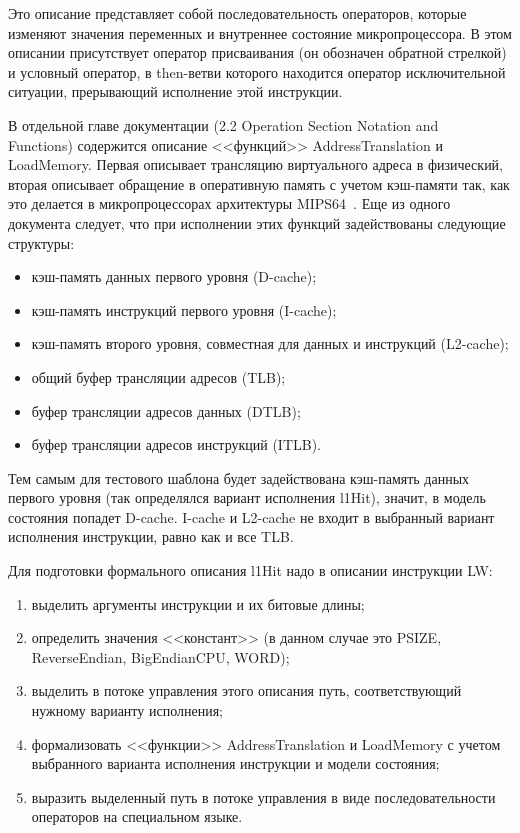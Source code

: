 Это описание представляет собой последовательность операторов, которые изменяют значения переменных и внутреннее состояние микропроцессора. В этом описании присутствует оператор присваивания (он обозначен обратной стрелкой) и условный оператор, в then-ветви которого находится оператор исключительной ситуации, прерывающий исполнение этой инструкции.

В отдельной главе документации (2.2 Operation Section Notation and\\Functions) содержится описание <<функций>> AddressTranslation и LoadMemory. Первая описывает трансляцию виртуального адреса в физический, вторая описывает обращение в оперативную память с учетом кэш-памяти так, как это делается в микропроцессорах архитектуры MIPS64~\cite{mips64II}. Еще из одного документа следует, что при исполнении этих функций задействованы следующие структуры:
\begin{itemize}
  \item кэш-память данных первого уровня (D-cache);
  \item кэш-память инструкций первого уровня (I-cache);
  \item кэш-память второго уровня, совместная для данных и инструкций
(L2-cache);
  \item общий буфер трансляции адресов (TLB);
  \item буфер трансляции адресов данных (DTLB);
  \item буфер трансляции адресов инструкций (ITLB).
\end{itemize}

Тем самым для тестового шаблона будет задействована кэш-память данных первого уровня (так определялся вариант исполнения l1Hit), значит, в модель состояния попадет D-cache. I-cache и L2-cache не входит в выбранный вариант исполнения инструкции, равно как и все TLB.

Для подготовки формального описания l1Hit надо в описании инструкции LW:
\begin{enumerate}
  \item выделить аргументы инструкции и их битовые длины;
  \item определить значения <<констант>> (в данном случае это PSIZE,\\
ReverseEndian, BigEndianCPU, WORD);
  \item выделить в потоке управления этого описания путь, соответствующий
нужному варианту исполнения;
  \item формализовать <<функции>> AddressTranslation и LoadMemory с учетом
выбранного варианта исполнения инструкции и модели состояния;
  \item выразить выделенный путь в потоке управления в виде последовательности
операторов на специальном языке.
\end{enumerate}

